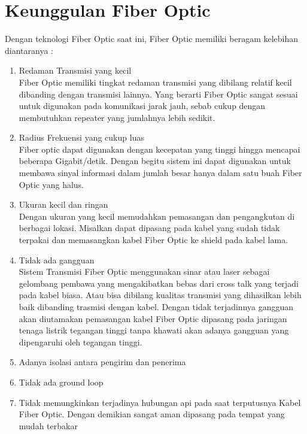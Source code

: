 \section{Keunggulan Fiber Optic}
\begin{flushleft}
Dengan teknologi Fiber Optic saat ini, Fiber Optic memiliki beragam kelebihan diantaranya : \\
\begin{enumerate}
\item Redaman Transmisi yang kecil \\ Fiber Optic memiliki tingkat redaman transmisi yang dibilang relatif kecil dibanding dengan transmisi lainnya. Yang berarti Fiber Optic sangat sesuai untuk digunakan pada komunikasi jarak jauh, sebab cukup dengan membutuhkan repeater yang jumlahnya lebih sedikit.
\item Radius Frekuensi yang cukup luas \\ Fiber optic dapat digunakan dengan kecepatan yang tinggi hingga mencapai beberapa Gigabit/detik. Dengan begitu sistem ini dapat digunakan untuk membawa sinyal informasi dalam jumlah besar hanya dalam satu buah Fiber Optic yang halus.
\item Ukuran kecil dan ringan \\ Dengan ukuran yang kecil memudahkan pemasangan dan pengangkutan di berbagai lokasi. Misalkan dapat dipasang pada kabel yang sudah tidak terpakai dan memasangkan kabel Fiber Optic ke shield pada kabel lama.
\item Tidak ada gangguan \\ Sistem Transmisi Fiber Optic menggunakan sinar atau laser sebagai gelombang pembawa yang mengakibatkan bebas dari cross talk yang terjadi pada kabel biasa. Atau bisa dibilang kualitas transmisi yang dihasilkan lebih baik dibanding trasmisi dengan kabel. Dengan tidak terjadinnya gangguan akan diutamakan pemasangan kabel Fiber Optic dipasang pada jaringan tenaga listrik tegangan tinggi tanpa khawati akan adanya gangguan yang dipengaruhi oleh tegangan tinggi.
\item Adanya isolasi antara pengirim dan penerima
\item Tidak ada ground loop
\item Tidak memungkinkan terjadinya hubungan api pada saat terputusnya Kabel Fiber Optic. Dengan demikian sangat aman dipasang pada tempat yang mudah terbakar
\end{enumerate}
\end{flushleft}
